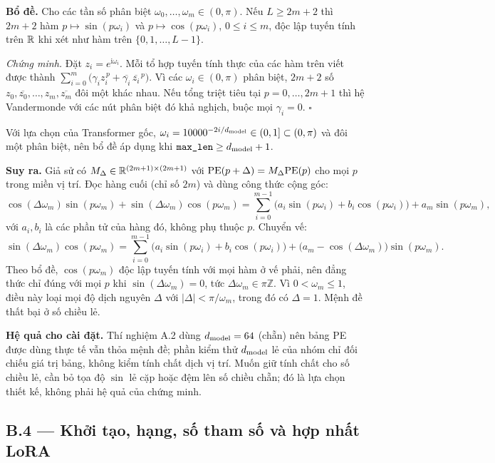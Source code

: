\textbf{Bổ đề.} Cho các tần số phân biệt $\omega_0,\ldots,\omega_m\in(0,\pi)$. Nếu
$L\ge 2m+2$ thì $2m+2$ hàm $p\mapsto\sin(p\omega_i)$ và $p\mapsto\cos(p\omega_i)$,
$0\le i\le m$, độc lập tuyến tính trên $\mathbb{R}$ khi xét như hàm trên
$\{0,1,\ldots,L-1\}$.

\emph{Chứng minh.} Đặt $z_i=e^{\mathrm i\omega_i}$. Mỗi tổ hợp tuyến tính thực của
các hàm trên viết được thành
$\sum_{i=0}^{m}\bigl(\gamma_i z_i^{\,p}+\overline{\gamma_i}\,\overline{z_i}^{\,p}\bigr)$.
Vì các $\omega_i\in(0,\pi)$ phân biệt, $2m+2$ số
$z_0,\overline{z_0},\ldots,z_m,\overline{z_m}$ đôi một khác nhau. Nếu tổng triệt
tiêu tại $p=0,\ldots,2m+1$ thì hệ Vandermonde với các nút phân biệt đó khả nghịch,
buộc mọi $\gamma_i=0$. \hfill$\square$

Với lựa chọn của Transformer gốc, $\omega_i=10000^{-2i/d_{\mathrm{model}}}\in(0,1]\subset(0,\pi)$
và đôi một phân biệt, nên bổ đề áp dụng khi $\texttt{max\_len}\ge d_{\mathrm{model}}+1$.

\textbf{Suy ra.} Giả sử có $M_\Delta\in\mathbb{R}^{(2m+1)\times(2m+1)}$ với
$\mathrm{PE}(p+\Delta)=M_\Delta\mathrm{PE}(p)$ cho mọi $p$ trong miền vị trí. Đọc hàng cuối (chỉ số
$2m$) và dùng công thức cộng góc:
\[
  \cos(\Delta\omega_m)\sin(p\omega_m)+\sin(\Delta\omega_m)\cos(p\omega_m)
  =\sum_{i=0}^{m-1}\bigl(a_i\sin(p\omega_i)+b_i\cos(p\omega_i)\bigr)
   +a_m\sin(p\omega_m),
\]
với $a_i,b_i$ là các phần tử của hàng đó, không phụ thuộc $p$. Chuyển vế:
\[
  \sin(\Delta\omega_m)\cos(p\omega_m)
  =\sum_{i=0}^{m-1}\bigl(a_i\sin(p\omega_i)+b_i\cos(p\omega_i)\bigr)
   +\bigl(a_m-\cos(\Delta\omega_m)\bigr)\sin(p\omega_m).
\]
Theo bổ đề, $\cos(p\omega_m)$ độc lập tuyến tính với mọi hàm ở vế phải, nên đẳng
thức chỉ đúng với mọi $p$ khi $\sin(\Delta\omega_m)=0$, tức
$\Delta\omega_m\in\pi\mathbb Z$. Vì $0<\omega_m\le1$, điều này loại mọi độ dịch
nguyên $\Delta$ với $|\Delta|<\pi/\omega_m$, trong đó có $\Delta=1$. Mệnh đề thất
bại ở số chiều lẻ.

\textbf{Hệ quả cho cài đặt.} Thí nghiệm A.2 dùng $d_{\mathrm{model}}=64$ (chẵn) nên bảng PE
được dùng thực tế vẫn thỏa mệnh đề; phần kiểm thử $d_{\mathrm{model}}$ lẻ của nhóm chỉ đối
chiếu giá trị bảng, không kiểm tính chất dịch vị trí. Muốn giữ tính chất cho số
chiều lẻ, cần bỏ tọa độ $\sin$ lẻ cặp hoặc đệm lên số chiều chẵn; đó là lựa chọn
thiết kế, không phải hệ quả của chứng minh.

\subsection{B.4 --- Khởi tạo, hạng, số tham số và hợp nhất LoRA}
\label{sec:b4}

